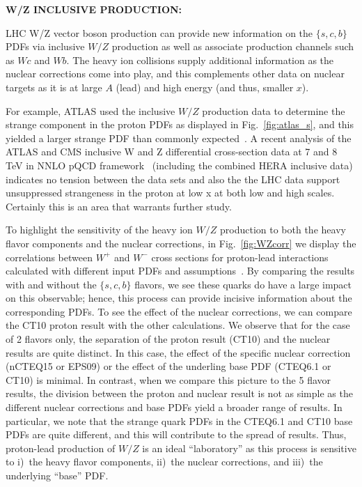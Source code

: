 \documentclass[../report.tex]{subfiles}
\begin{document}


{\bf W/Z INCLUSIVE PRODUCTION:}

LHC W/Z  vector boson production can provide new information on the $\{s,c,b\}$ PDFs 
via  inclusive $W/Z$ production as well as associate production channels such as $Wc$ and $Wb$. 
The heavy ion collisions supply additional information as the nuclear corrections come into play,
and this complements other data on nuclear targets as it is at large $A$ (lead) and high energy (and thus, smaller $x$).  

For example, ATLAS used the inclusive $W/Z$ production data to determine the strange component in the proton PDFs as displayed in Fig.~\ref{fig:atlas_s}, and this yielded a larger strange PDF than commonly expected~\cite{Aad:2012sb,Aaboud:2016btc}. 
%
A recent analysis of the ATLAS and CMS inclusive W and Z differential
cross-section data at 7 and 8 TeV in NNLO pQCD framework~\cite{Cooper-Sarkar:2018ufj}
(including the combined HERA inclusive data) indicates no tension between the
data sets and also the the LHC data support unsuppressed strangeness
in the proton at low x at both low and high scales. 
Certainly this is an area that warrants further study. 

To highlight the sensitivity of the heavy ion $W/Z$ production to both the 
heavy flavor components and the nuclear corrections, 
in Fig.~\ref{fig:WZcorr} we display the correlations between $W^+$ and $W^-$ 
cross sections for proton-lead interactions calculated with different input PDFs and assumptions~\cite{Kusina:2016fxy}.
%
By comparing the results with and without the $\{s,c,b\}$ flavors, we see these quarks do have a
large impact on this observable;  hence, this process can provide incisive information about the 
corresponding PDFs. 
%
To see the effect of the nuclear corrections, we can compare the CT10 proton result with the other calculations. 
%
We observe that for the case of 2 flavors only, the separation of the proton result  (CT10) and the 
nuclear results are quite distinct. In this case, the effect of the specific nuclear correction (nCTEQ15 or EPS09)
or the effect of the underling base PDF (CTEQ6.1 or CT10) is minimal. 
%
In contrast, when we compare this picture to the 5 flavor results, the division between the proton and nuclear
result is not as simple as the different nuclear corrections and base PDFs yield a broader range of results. 
In particular, we note that the strange quark PDFs in the CTEQ6.1 and CT10 base PDFs are quite different, and this
will contribute to the spread of results. 
%
Thus, proton-lead  production of $W/Z$  is an ideal ``laboratory'' 
as this process is sensitive to i)~the heavy flavor components,
ii)~the nuclear corrections, and iii)~the underlying ``base'' PDF. 
\end{document}
